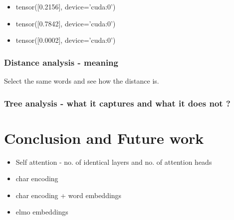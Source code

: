 \documentclass[a4paper, 11pt]{article}
\begin{document}
\begin{itemize}
\item tensor([0.2156], device='cuda:0')
\item tensor([0.7842], device='cuda:0')
\item tensor([0.0002], device='cuda:0')
\end{itemize}


\subsubsection{Distance analysis - meaning}
Select the same words and see how the distance is. 

\subsubsection{Tree analysis - what it captures and what it does not ?}


\pagebreak
\section{Conclusion and Future work}

\begin{itemize}
\item Self attention - no. of identical layers and no. of attention heads
\item char encoding
\item char encoding + word embeddings
\item elmo embeddings
\end{itemize}





 

\newpage
\printbibliography
%
\end{document}

